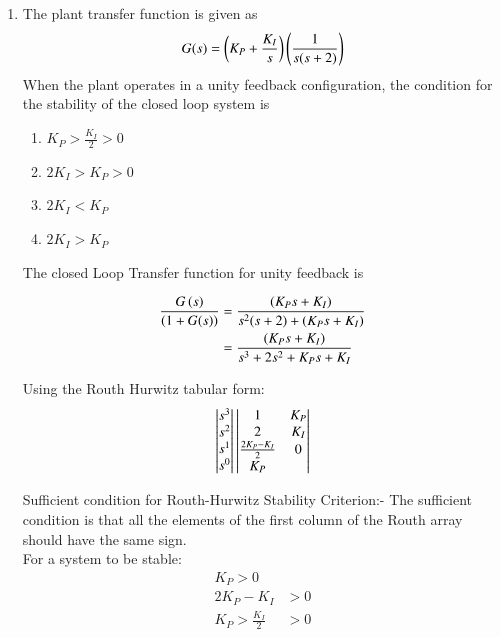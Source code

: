\begin{enumerate}[label=\thesection.\arabic*.,ref=\thesection.\theenumi]

\item The plant transfer function is given as
\begin{align}
G(s) = \brak{K_{P} + \frac{K_{I}}{s}}\brak{\frac{1}{s(s+2)}}
\label{eq:ee17btech11031_system1}
\end{align}
When the plant operates in a unity feedback configuration, the condition for the stability of the closed loop system is
 \begin{enumerate}
     \item $K_P > \frac{K_I}{2} > 0$
     \item $2K_I > K_P > 0$
     \item $2K_I < K_P$
     \item $2K_I > K_P$
 \end{enumerate} 

\solution The closed Loop Transfer function for unity feedback is

\begin{align}
\frac{G\brak{s}}{\brak{1 + G(s)}} &= \frac{\brak{K_{P}s + K_{I}}}{s^2(s+2) + \brak{K_{P}s + K_{I}}}
\label{eq:ee17btech11031_system}
\\
&= \frac{(K_{P}s + K_{I})}{s^3 + 2s^2 + K_{P}s + K_{I}}
\label{eq:ee17btech11031_system}
\end{align}

Using the Routh Hurwitz tabular form:
\begin{align}
\begin{vmatrix}s^3\\s^2\\s^1\\s^0\end{vmatrix}
\begin{vmatrix}1 & K_{P} \\ 2 & K_{I} \\ \frac{2K_{P} - K_{I}}{2} & 0 \\ K_{P}\end{vmatrix}
\end{align}

Sufficient condition for Routh-Hurwitz Stability Criterion:- The sufficient condition is that all the elements of the first column of the Routh array should have the same sign.
\\
For a system to be stable: 
\begin{align}
K_{P} > 0
\label{eq:ee17btech11031_cond1}\\
2K_{P} - K_{I} &> 0
\label{eq:ee17btech11031_cond2}\\
K_{P} > \frac{K_{I}}{2} &> 0
\label{eq:ee17btech11031_cond3}
\end{align}


\end{enumerate}
